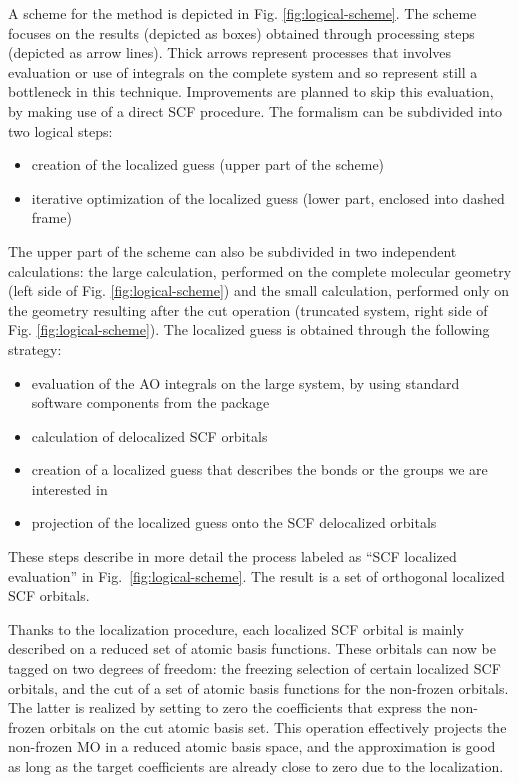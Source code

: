 A scheme for the method is depicted in Fig. \ref{fig:logical-scheme}.
The scheme focuses on the results (depicted as boxes) obtained through processing steps
(depicted as arrow lines). Thick arrows represent processes that involves evaluation or
use of integrals on the complete system and so represent still a bottleneck
in this technique. Improvements are planned to skip this evaluation, by making
use of a direct SCF procedure.
The formalism can be subdivided into two logical steps:
\begin{itemize}
\item creation of the localized guess (upper part of the scheme)
\item iterative optimization of the localized guess (lower part, enclosed
into dashed frame)
\end{itemize}
The upper part of the scheme can also be subdivided in two independent
calculations: the large calculation, performed on the complete molecular
geometry (left side of Fig. \ref{fig:logical-scheme}) and the small calculation,
performed only on the geometry resulting after the cut operation (truncated
system, right side of Fig. \ref{fig:logical-scheme}).  The localized guess
is obtained through the following strategy:
\begin{itemize}
\item evaluation of the AO integrals on the large system, by using standard
software components from the  package
\item calculation of delocalized SCF orbitals
\item creation of a localized guess that describes the bonds or the groups we are
interested in
\item projection of the localized guess onto the SCF delocalized orbitals
\end{itemize}



These steps describe in more detail the process labeled 
as ``SCF localized evaluation'' in Fig.~\ref{fig:logical-scheme}. The result
is a set of orthogonal localized SCF orbitals.

Thanks to the localization procedure, each localized SCF orbital is mainly
described on a reduced set of atomic basis functions. These orbitals can now
be tagged on two degrees of freedom: the freezing selection of certain
localized SCF orbitals, and the cut of a set of atomic basis functions for
the non-frozen orbitals. The latter is realized by setting to zero the
coefficients that express the non-frozen orbitals on the cut atomic basis
set. This operation effectively projects the non-frozen MO in a reduced
atomic basis space, and the approximation is good as long as the target
coefficients are already close to zero due to the localization.

